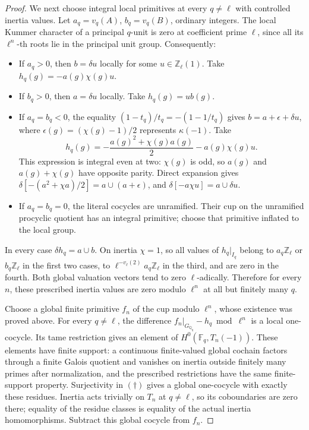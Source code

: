 \begin{proof}
We next choose integral local primitives at every
\(q\ne\ell\) with controlled inertia values. Let
\(a_q=v_q(A)\), \(b_q=v_q(B)\), ordinary integers.
The local Kummer character of a principal \(q\)-unit is
zero at coefficient prime \(\ell\), since all its
\(\ell^n\)-th roots lie in the principal unit group.
Consequently:
\begin{itemize}
 \item If \(a_q>0\), then \(b=\delta u\) locally for
 some \(u\in\mathbb Z_\ell(1)\). Take
 \(h_q(g)=-a(g)\chi(g)u\).
 \item If \(b_q>0\), then \(a=\delta u\) locally.
 Take \(h_q(g)=u b(g)\).
 \item If \(a_q=b_q<0\), the equality
 \((1-t_q)/t_q=-(1-1/t_q)\) gives
 \(b=a+\epsilon+\delta u\), where
 \(\epsilon(g)=(\chi(g)-1)/2\) represents
 \(\kappa(-1)\). Take
 \[
 h_q(g)=-\frac{a(g)^2+\chi(g)a(g)}2
                   -a(g)\chi(g)u.
 \]
 This expression is integral even at two: \(\chi(g)\)
 is odd, so \(a(g)\) and \(a(g)+\chi(g)\) have opposite
 parity. Direct expansion gives
 \(\delta[-(a^2+\chi a)/2]=a\cup(a+\epsilon)\), and
 \(\delta[-a\chi u]=a\cup\delta u\).
 \item If \(a_q=b_q=0\), the literal cocycles are
 unramified. Their cup on the unramified procyclic
 quotient has an integral primitive; choose that
 primitive inflated to the local group.
\end{itemize}
In every case \(\delta h_q=a\cup b\). On inertia
\(\chi=1\), so all values of \(h_q|_{I_q}\) belong
to \(a_q\mathbb Z_\ell\) or \(b_q\mathbb Z_\ell\)
in the first two cases, to
\(\ell^{-v_\ell(2)}a_q\mathbb Z_\ell\) in the third,
and are zero in the fourth. Both global valuation
vectors tend to zero \(\ell\)-adically. Therefore for
every \(n\), these prescribed inertia values are zero
modulo \(\ell^n\) at all but finitely many \(q\).

Choose a global finite primitive \(f_n\) of the cup
modulo \(\ell^n\), whose existence was proved above.
For every \(q\ne\ell\), the difference
\(f_n|_{G_{\mathbb Q_q}}-h_q\bmod\ell^n\) is a
local one-cocycle. Its tame restriction gives an
element of \(H^0(\mathbb F_q,T_n(-1))\). These elements
have finite support: a continuous finite-valued global
cochain factors through a finite Galois quotient and
vanishes on inertia outside finitely many primes after
normalization, and the prescribed restrictions have
the same finite-support property. Surjectivity in
\((\dagger)\) gives a global one-cocycle with exactly
these residues. Inertia acts trivially on \(T_n\) at
\(q\ne\ell\), so its coboundaries are zero there; equality
of the residue classes is equality of the actual inertia
homomorphisms. Subtract this global cocycle from \(f_n\).


\end{proof}
